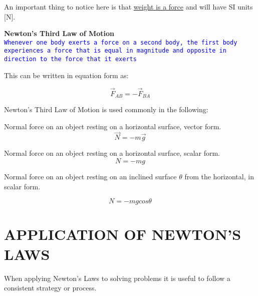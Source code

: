 \documentclass[12pt, letterpaper, twoside]{article}
\begin{document}
\bigskip

An important thing to notice here is that \underline{weight is a force} and will have SI units [N].

\bigskip


\bigskip
\textbf{Newton’s Third Law of Motion}\\
\texttt{\textcolor{blue}{Whenever one body exerts a force on a second body, the first body experiences a force that is equal in magnitude and opposite in direction to the force that it exerts}}

\bigskip

This can be written in equation form as:

\begin{equation}
\overrightarrow{F}_{AB} = - \overrightarrow{F}_{BA}
\end{equation}


\bigskip

Newton’s Third Law of Motion is used commonly in the following:

\bigskip


Normal force on an object resting on a horizontal surface,
vector form.
\begin{equation}
\overrightarrow{N} = -m \overrightarrow{g}
\end{equation}

Normal force on an object resting on a horizontal surface,
scalar form.
\begin{equation}
N = -mg
\end{equation}


Normal force on an object resting on an inclined surface $\theta$ from the horizontal, in
scalar form.

\begin{equation}
N = -m g cos \theta
\end{equation}

\newpage


\section{APPLICATION OF NEWTON'S LAWS}

\bigskip

When applying Newton's Laws to solving problems it is useful to follow a consistent strategy or process.
\end{document}
